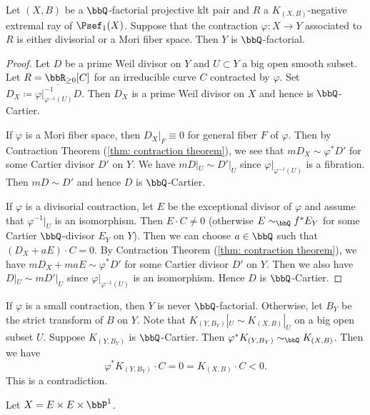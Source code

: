     \begin{proposition}\label{prop:divisorial_or_fibered_contraction_preverses_Q_factorial}
        Let \((X,B)\) be a \(\bbQ\)-factorial projective klt pair and \(R\) a \(K_{(X,B)}\)-negative extremal ray of \(\Psef_1(X)\).
        Suppose that the contraction \(\varphi:X\to Y\) associated to \(R\) is either divisorial or a Mori fiber space.
        Then \(Y\) is \(\bbQ\)-factorial.
    \end{proposition}
    \begin{proof}
        Let \(D\) be a prime Weil divisor on \(Y\) and \(U \subset Y\) a big open smooth subset.
        Let \(R = \bbR_{\geq 0}[C]\) for an irreducible curve \(C\) contracted by \(\varphi\).
        Set \(D_X \coloneqq \overline{\varphi|_{\varphi^{-1}(U)}^{-1} D}\).
        Then \(D_X\) is a prime Weil divisor on \(X\) and hence is \(\bbQ\)-Cartier.

        If \(\varphi\) is a Mori fiber space, then \(D_X|_F \equiv 0\) for general fiber \(F\) of \(\varphi\).
        Then by Contraction Theorem (\cref{thm: contraction theorem}), we see that \(mD_X \sim \varphi^* D'\) for some Cartier divisor \(D'\) on \(Y\).
        We have \(mD|_{U} \sim D'|_{U}\) since \(\varphi|_{\varphi^{-1}(U)}\) is a fibration.
        Then \(mD \sim D'\) and hence \(D\) is \(\bbQ\)-Cartier.

        If \(\varphi\) is a divisorial contraction, let \(E\) be the exceptional divisor of \(\varphi\) and assume that \(\varphi^{-1}|_U\) is an isomorphism.
        Then \(E \cdot C \neq 0\) (otherwise \(E \sim_{\bbQ} f^*E_Y\) for some Cartier \(\bbQ\)-divisor \(E_Y\) on \(Y\)).
        Then we can choose \(a\in\bbQ\) such that \((D_X + aE)\cdot C = 0\).
        By Contraction Theorem (\cref{thm: contraction theorem}), we have \(mD_X + maE \sim \varphi^* D'\) for some Cartier divisor \(D'\) on \(Y\).
        Then we also have \(D|_{U} \sim mD'|_{U}\) since \(\varphi|_{\varphi^{-1}(U)}\) is an isomorphism.
        Hence \(D\) is \(\bbQ\)-Cartier.
    \end{proof}
    \begin{remark}\label{rmk:small_contraction_is_never_Q_factorial}
        If \(\varphi\) is a small contraction, then \(Y\) is never \(\bbQ\)-factorial.
        Otherwise, let \(B_Y\) be the strict transform of \(B\) on \(Y\).
        Note that \(K_{(Y,B_Y)}|_U \sim K_{(X,B)}|_U\) on a big open subset \(U\).
        Suppose \(K_{(Y,B_Y)}\) is \(\bbQ\)-Cartier.
        Then \(\varphi^*K_{(Y,B_Y)} \sim_\bbQ K_{(X,B)}\).
        Then we have
        \[ \varphi^*K_{(Y,B_Y)}\cdot C = 0 = K_{(X,B)}\cdot C < 0. \]
        This is a contradiction.
    \end{remark}

    \begin{example}
        Let \(X = E\times E \times \bbP^1\).
    \end{example}


